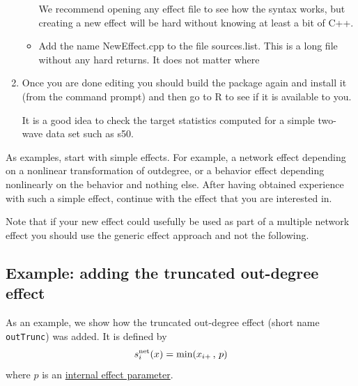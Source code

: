 \documentclass[a4paper,fleqn,11pt]{article}
\newcommand{\+}{\, + \,}
\newcommand{\sfn}[1]{\textsf{#1}}
\begin{document}
\begin{enumerate}
\begin{itemize}
                  We recommend opening any effect file to see
                  how the syntax works, but creating a new effect will be hard
                   without knowing at least a bit of C++.
            \item Add the name \textsf{NewEffect.cpp} to the file \textsf{sources.list}.
                  This is a long file without any hard returns. It does not matter where

		\end{itemize}

		\item Once you are done editing you should build
the package again and install it (from the command prompt)
and then go to R to see if it is available to you.

It is a good idea to check the target statistics computed for a simple
two-wave data set such as \sfn{s50}.
\end{enumerate}

As examples, start with simple effects.
For example, a network effect depending on a nonlinear transformation
of outdegree, or a behavior effect depending nonlinearly
on the behavior and nothing else.
After having obtained experience with such a simple effect,
continue with the effect that you are interested in.

Note that if your new effect could usefully be used as part of a multiple
network effect you should use the generic effect approach and not the following.


\subsection{Example: adding the truncated out-degree effect}

As an example, we show how the truncated out-degree effect
(short name \texttt{outTrunc}) was added. It is
 defined by
 \begin{equation}
  s^{\rm net}_{i}(x) = \text{min}(x_{i+}\,,\, p)   \label{outTrunc}
 \end{equation}
where $p$ is an \hyperlink{T_effpar}{internal effect parameter}.
\end{document}
